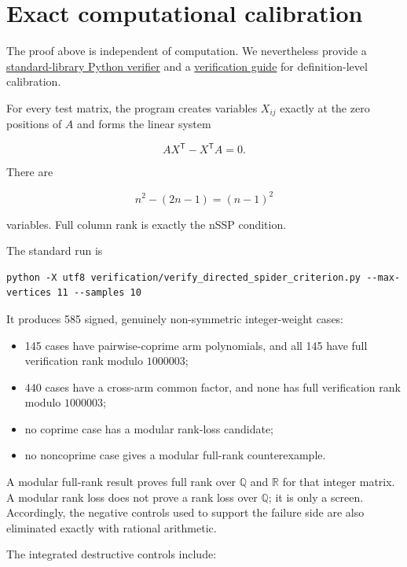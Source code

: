 \documentclass[11pt]{article}
\theoremstyle{remark}
\begin{document}
\section{Exact computational calibration}

The proof above is independent of computation. We nevertheless provide a \href{verification/verify_directed_spider_criterion.py}{standard-library Python verifier} and a \href{verification/README.md}{verification guide} for definition-level calibration.

For every test matrix, the program creates variables $X_{ij}$ exactly at the zero positions of $A$ and forms the linear system

\[
AX^{\mathsf T}-X^{\mathsf T}A=0.
\]

There are

\[
n^2-(2n-1)=(n-1)^2
\]

variables. Full column rank is exactly the nSSP condition.

The standard run is

\begin{Verbatim}[fontsize=\small,breaklines=true,breakanywhere=true,breaksymbolleft={},breaksymbolright={}]
python -X utf8 verification/verify_directed_spider_criterion.py --max-vertices 11 --samples 10
\end{Verbatim}

It produces 585 signed, genuinely non-symmetric integer-weight cases:

\begin{itemize}
\item 145 cases have pairwise-coprime arm polynomials, and all 145 have full verification rank modulo $1000003$;
\item 440 cases have a cross-arm common factor, and none has full verification rank modulo $1000003$;
\item no coprime case has a modular rank-loss candidate;
\item no noncoprime case gives a modular full-rank counterexample.

\end{itemize}

A modular full-rank result proves full rank over $\mathbb Q$ and $\mathbb R$ for that integer matrix. A modular rank loss does not prove a rank loss over $\mathbb Q$; it is only a screen. Accordingly, the negative controls used to support the failure side are also eliminated exactly with rational arithmetic.

The integrated destructive controls include:
\end{document}
